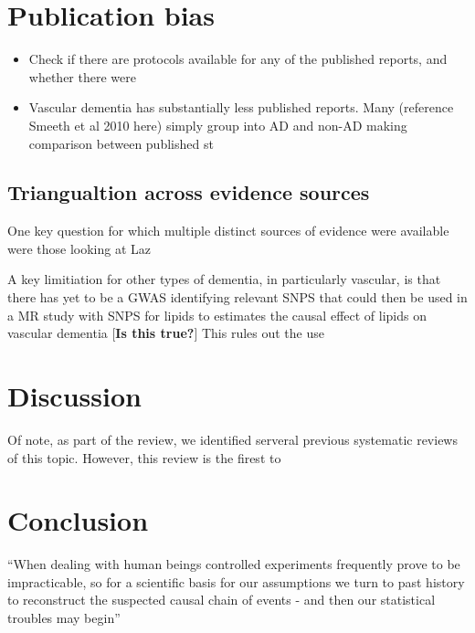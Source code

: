 \documentclass[a4paper, twoside]{templates/ociamthesis}
\providecommand{\tightlist}{%
  \setlength{\itemsep}{0pt}\setlength{\parskip}{0pt}}
\begin{document}
\hypertarget{publication-bias}{%
\section{Publication bias}\label{publication-bias}}

\begin{itemize}
\tightlist
\item
  Check if there are protocols available for any of the published reports, and whether there were
\item
  Vascular dementia has substantially less published reports. Many (reference Smeeth et al 2010 here) simply group into AD and non-AD making comparison between published st
\end{itemize}

\hypertarget{triangualtion-across-evidence-sources}{%
\subsection{Triangualtion across evidence sources}\label{triangualtion-across-evidence-sources}}

One key question for which multiple distinct sources of evidence were available were those looking at Laz

A key limitiation for other types of dementia, in particularly vascular, is that there has yet to be a GWAS identifying relevant SNPS that could then be used in a MR study with SNPS for lipids to estimates the causal effect of lipids on vascular dementia {[}\textbf{Is this true?}{]} This rules out the use

\hypertarget{discussion}{%
\section{Discussion}\label{discussion}}

Of note, as part of the review, we identified serveral previous systematic reviews of this topic. However, this review is the firest to

\hypertarget{conclusion}{%
\section{Conclusion}\label{conclusion}}

\begin{savequote}
``When dealing with human beings controlled experiments frequently prove
to be impracticable, so for a scientific basis for our assumptions we
turn to past history to reconstruct the suspected causal chain of events
- and then our statistical troubles may begin''
\end{savequote}
\end{document}
